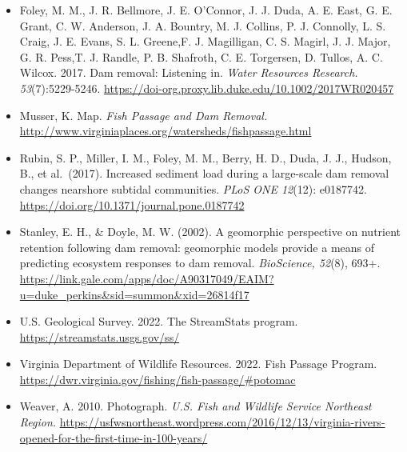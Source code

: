 \documentclass[
  12pt,
]{article}
\begin{document}
\begin{itemize}
\item
  Foley, M. M., J. R. Bellmore, J. E. O'Connor, J. J. Duda, A. E. East,
  G. E. Grant, C. W. Anderson, J. A. Bountry, M. J. Collins, P. J.
  Connolly, L. S. Craig, J. E. Evans, S. L. Greene,F. J. Magilligan, C.
  S. Magirl, J. J. Major, G. R. Pess,T. J. Randle, P. B. Shafroth, C. E.
  Torgersen, D. Tullos, A. C. Wilcox. 2017. Dam removal: Listening in.
  \emph{Water Resources Research. 53}(7):5229-5246.
  \url{https://doi-org.proxy.lib.duke.edu/10.1002/2017WR020457}
\item
  Musser, K. Map. \emph{Fish Passage and Dam Removal.}
  \url{http://www.virginiaplaces.org/watersheds/fishpassage.html}
\item
  Rubin, S. P., Miller, I. M., Foley, M. M., Berry, H. D., Duda, J. J.,
  Hudson, B., et al.~(2017). Increased sediment load during a
  large-scale dam removal changes nearshore subtidal communities.
  \emph{PLoS ONE 12}(12): e0187742.
  \url{https://doi.org/10.1371/journal.pone.0187742}
\item
  Stanley, E. H., \& Doyle, M. W. (2002). A geomorphic perspective on
  nutrient retention following dam removal: geomorphic models provide a
  means of predicting ecosystem responses to dam removal.
  \emph{BioScience, 52}(8), 693+.
  \url{https://link.gale.com/apps/doc/A90317049/EAIM?u=duke_perkins\&sid=summon\&xid=26814f17}
\item
  U.S. Geological Survey. 2022. The StreamStats program.
  \url{https://streamstats.usgs.gov/ss/}
\item
  Virginia Department of Wildlife Resources. 2022. Fish Passage Program.
  \url{https://dwr.virginia.gov/fishing/fish-passage/\#potomac}
\item
  Weaver, A. 2010. Photograph. \emph{U.S. Fish and Wildlife Service
  Northeast Region.}
  \url{https://usfwsnortheast.wordpress.com/2016/12/13/virginia-rivers-opened-for-the-first-time-in-100-years/}
\end{itemize}
\end{document}
